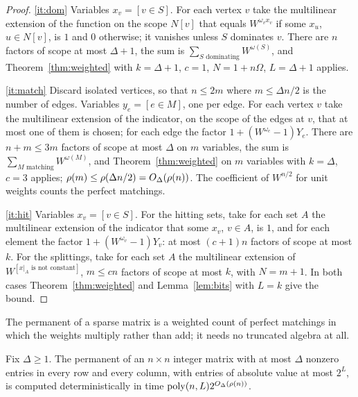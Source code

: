 \begin{proof}
\ref{it:dom} Variables $x_v=[v\in S]$. For each vertex $v$ take the multilinear
extension of the function on the scope $N[v]$ that equals $W^{\omega_vx_v}$ if
some $x_u$, $u\in N[v]$, is $1$ and $0$ otherwise; it vanishes unless $S$
dominates $v$. There are $n$ factors of scope at most $\Delta+1$, the sum is
$\sum_{S\text{ dominating}}W^{\omega(S)}$, and Theorem~\ref{thm:weighted} with
$k=\Delta+1$, $c=1$, $N=1+n\Omega$, $L=\Delta+1$ applies.

\ref{it:match} Discard isolated vertices, so that $n\le2m$ where $m\le\Delta n/2$
is the number of edges. Variables $y_e=[e\in M]$, one per edge. For each vertex
$v$ take the multilinear extension of the indicator, on the scope of the edges at
$v$, that at most one of them is chosen; for each edge the factor
$1+(W^{\omega_e}-1)Y_e$. There are $n+m\le3m$ factors of scope at most
$\Delta$ on $m$ variables, the sum is $\sum_{M\text{ matching}}W^{\omega(M)}$,
and Theorem~\ref{thm:weighted} on $m$ variables with $k=\Delta$, $c=3$ applies;
$\rho(m)\le\rho(\Delta n/2)=O_\Delta(\rho(n))$. The coefficient of $W^{n/2}$
for unit weights counts the perfect matchings.

\ref{it:hit} Variables $x_v=[v\in S]$. For the hitting sets, take for each set
$A$ the multilinear extension of the indicator that some $x_v$, $v\in A$, is
$1$, and for each element the factor $1+(W^{\omega_v}-1)Y_v$: at most
$(c+1)n$ factors of scope at most $k$. For the splittings, take for each set
$A$ the multilinear extension of $W^{[\text{$x|_A$ is not constant}]}$, $m\le cn$
factors of scope at most $k$, with $N=m+1$. In both cases
Theorem~\ref{thm:weighted} and Lemma~\ref{lem:bits} with $L=k$ give the bound.
\end{proof}

The permanent of a sparse matrix is a weighted count of perfect matchings in
which the weights multiply rather than add; it needs no truncated algebra at
all.

\begin{theorem}\label{thm:permanent}
Fix $\Delta\ge1$. The permanent of an $n\times n$ integer matrix with at most
$\Delta$ nonzero entries in every row and every column, with entries of absolute
value at most $2^{L}$, is computed deterministically in time
$\operatorname{poly}(n,L)2^{O_\Delta(\rho(n))}$.
\end{theorem}

